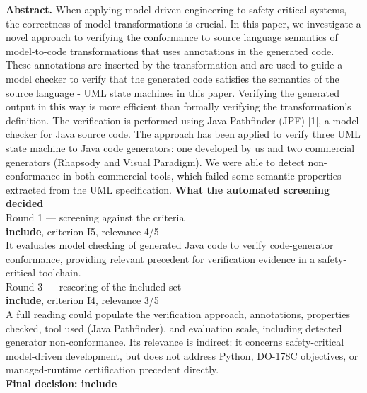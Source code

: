 \documentclass[11pt,a4paper]{article}
\begin{document}
{\small\textbf{Abstract.} When applying model-driven engineering to safety-critical systems, the correctness of model transformations is crucial. In this paper, we investigate a novel approach to verifying the conformance to source language semantics of model-to-code transformations that uses annotations in the generated code. These annotations are inserted by the transformation and are used to guide a model checker to verify that the generated code satisfies the semantics of the source language - UML state machines in this paper. Verifying the generated output in this way is more efficient than formally verifying the transformation's definition. The verification is performed using Java Pathfinder (JPF) [1], a model checker for Java source code. The approach has been applied to verify three UML state machine to Java code generators: one developed by us and two commercial generators (Rhapsody and Visual Paradigm). We were able to detect non-conformance in both commercial tools, which failed some semantic properties extracted from the UML specification.}
\vspace{3mm}
\vspace{2.5mm}
{\small\textbf{What the automated screening decided}}\\[2mm]
{\footnotesize\color{soft}Round 1 --- screening against the criteria}\\[0.5mm]
{\small\textbf{include}, criterion I5, relevance 4/5}\\[0.5mm]
{\small It evaluates model checking of generated Java code to verify code-generator conformance, providing relevant precedent for verification evidence in a safety-critical toolchain.}\\[2.5mm]
{\footnotesize\color{soft}Round 3 --- rescoring of the included set}\\[0.5mm]
{\small\textbf{include}, criterion I4, relevance 3/5}\\[0.5mm]
{\small A full reading could populate the verification approach, annotations, properties checked, tool used (Java Pathfinder), and evaluation scale, including detected generator non-conformance. Its relevance is indirect: it concerns safety-critical model-driven development, but does not address Python, DO-178C objectives, or managed-runtime certification precedent directly.}\\[2.5mm]
{\small\textbf{Final decision: include}}
\vspace{2mm}
\end{document}
